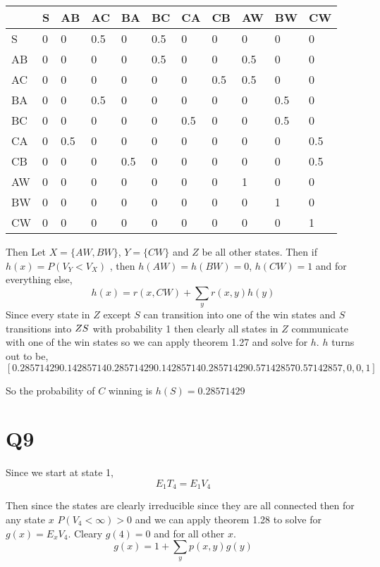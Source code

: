 \documentclass{article}
\begin{document}
\begin{tabular}{|l|l|l|l|l|l|l|l|l|l|l|}
\hline
   & S & AB  & AC  & BA  & BC  & CA  & CB  & AW  & BW  & CW  \\ 
   \hline
S  & 0 & 0   & 0.5 & 0   & 0.5 & 0   & 0   & 0   & 0   & 0   \\ 
\hline
AB & 0 & 0   & 0   & 0   & 0.5 & 0   & 0   & 0.5 & 0   & 0   \\ 
\hline
AC & 0 & 0   & 0   & 0   & 0   & 0   & 0.5 & 0.5 & 0   & 0   \\ 
\hline
BA & 0 & 0   & 0.5 & 0   & 0   & 0   & 0   & 0   & 0.5 & 0   \\ 
\hline
BC & 0 & 0   & 0   & 0   & 0   & 0.5 & 0   & 0   & 0.5 & 0   \\ 
\hline
CA & 0 & 0.5 & 0   & 0   & 0   & 0   & 0   & 0   & 0   & 0.5 \\ 
\hline
CB & 0 & 0   & 0   & 0.5 & 0   & 0   & 0   & 0   & 0   & 0.5 \\ 
\hline
AW & 0 & 0   & 0   & 0   & 0   & 0   & 0   & 1   & 0   & 0   \\ 
\hline
BW & 0 & 0   & 0   & 0   & 0   & 0   & 0   & 0   & 1   & 0   \\ 
\hline
CW & 0 & 0   & 0   & 0   & 0   & 0   & 0   & 0   & 0   & 1 \\ \hline
\end{tabular}

Then Let $X = \{AW, BW\}$, $Y = \{CW\}$ and $Z$ be all other states. 
Then if $h(x) = P(V_Y < V_X)$ , then $h(AW) = h(BW) = 0$, $h(CW) = 1$ and for everything else,
\[
h(x) = r(x,CW) + \sum_y r(x,y)h(y)
\]
Since every state in $Z$ except $S$ can transition into one of the win states and $S$ transitions into $Z \\ S$ with probability 1 then clearly all states in $Z$ communicate with one of the win states so we can apply theorem 1.27 and solve for $h$.
$h$ turns out to be,
\[
[ 0.28571429  0.14285714  0.28571429  0.14285714  0.28571429  0.57142857
  0.57142857, 0, 0, 1]
  \]
  
So the probability of $C$ winning is $h(S) = 0.28571429$

\section*{Q9}
Since we start at state 1,
\[
E_1T_4 = E_1V_4
\]

Then since the states are clearly irreducible since they are all connected then for any state $x$ $P(V_4 < \infty) > 0 $ and we can apply theorem 1.28 to solve for
$
g(x) = E_xV_4
$. 
Cleary $g(4) = 0$  and for all other $x$.
\[
g(x) = 1 + \sum_y p(x,y)g(y)
\]
\end{document}
